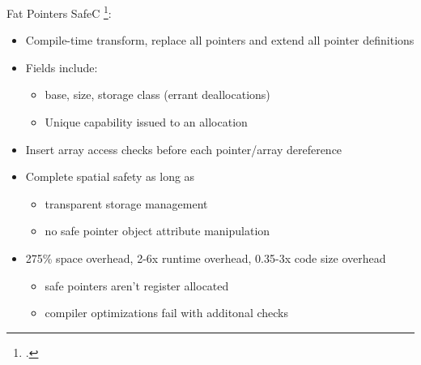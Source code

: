 \documentclass[aspectratio=169]{beamer}
\begin{document}
\begin{frame}{Fat Pointers}
SafeC \footcite{austin_efficient_1994}:
  \begin{itemize}
     \item Compile-time transform, replace all pointers and extend all pointer definitions
     \item Fields include:
          \begin{itemize}
             \item base, size, storage class (errant deallocations)
             \item Unique capability issued to an allocation
          \end{itemize}
     \item Insert array access checks before each pointer/array dereference
     \item Complete spatial safety as long as
         \begin{itemize}
            \item transparent storage management
            \item no safe pointer object attribute manipulation
         \end{itemize}
     \item 275\% space overhead, 2-6x runtime overhead, 0.35-3x code size overhead
         \begin{itemize}
            \item safe pointers aren't register allocated
            \item compiler optimizations fail with additonal checks
         \end{itemize}
  \end{itemize}
\end{frame}
\end{document}
